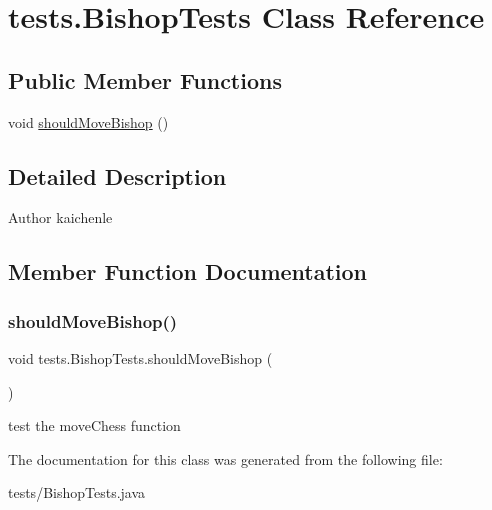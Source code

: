 \hypertarget{classtests_1_1_bishop_tests}{}\section{tests.\+Bishop\+Tests Class Reference}
\label{classtests_1_1_bishop_tests}
\subsection*{Public Member Functions}
\begin{DoxyCompactItemize}
\item 
void \mbox{\hyperlink{classtests_1_1_bishop_tests_a8589665c879f8d73e7eda83873eb24e5}{should\+Move\+Bishop}} ()
\end{DoxyCompactItemize}


\subsection{Detailed Description}
\begin{DoxyAuthor}{Author}
kaichenle 
\end{DoxyAuthor}


\subsection{Member Function Documentation}
\mbox{\label{classtests_1_1_bishop_tests_a8589665c879f8d73e7eda83873eb24e5}} 
\subsubsection{\texorpdfstring{should\+Move\+Bishop()}{shouldMoveBishop()}}
{\footnotesize\ttfamily void tests.\+Bishop\+Tests.\+should\+Move\+Bishop (\begin{DoxyParamCaption}{ }\end{DoxyParamCaption})\hspace{0.3cm}{\ttfamily [inline]}}

test the move\+Chess function 

The documentation for this class was generated from the following file\+:\begin{DoxyCompactItemize}
\item 
tests/Bishop\+Tests.\+java\end{DoxyCompactItemize}
